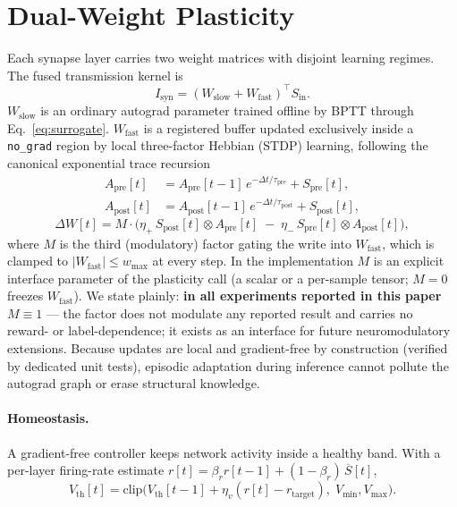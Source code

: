 \documentclass[11pt]{article}
\newcommand{\Wslow}{W_{\text{slow}}}
\newcommand{\Wfast}{W_{\text{fast}}}
\begin{document}
\section{Dual-Weight Plasticity}
Each synapse layer carries two weight matrices with disjoint learning
regimes. The fused transmission kernel is
\begin{equation}
I_{\text{syn}} = (\Wslow + \Wfast)^{\!\top} S_{\text{in}} .
\end{equation}
$\Wslow$ is an ordinary autograd parameter trained offline by BPTT through
Eq.~\eqref{eq:surrogate}. $\Wfast$ is a registered buffer updated
exclusively inside a \texttt{no\_grad} region by local three-factor Hebbian
(STDP) learning, following the canonical exponential trace recursion
\begin{align}
A_{\text{pre}}[t] &= A_{\text{pre}}[t-1]\,e^{-\Delta t/\tau_{\text{pre}}}
   + S_{\text{pre}}[t], \\
A_{\text{post}}[t] &= A_{\text{post}}[t-1]\,e^{-\Delta t/\tau_{\text{post}}}
   + S_{\text{post}}[t],
\end{align}
\begin{equation}
\Delta W[t] = M\cdot\Big(\eta_+\, S_{\text{post}}[t] \otimes A_{\text{pre}}[t]
   \;-\; \eta_-\, S_{\text{pre}}[t] \otimes A_{\text{post}}[t]\Big),
\label{eq:stdp}
\end{equation}
where $M$ is the third (modulatory) factor gating the write into $\Wfast$,
which is clamped to $|{\Wfast}|\le w_{\max}$ at every step. In the
implementation $M$ is an explicit interface parameter of the plasticity
call (a scalar or a per-sample tensor; $M=0$ freezes $\Wfast$). We state
plainly: \textbf{in all experiments reported in this paper $M \equiv 1$} ---
the factor does not modulate any reported result and carries no
reward- or label-dependence; it exists as an interface for future
neuromodulatory extensions. Because updates
are local and gradient-free by construction (verified by dedicated unit
tests), episodic adaptation during inference cannot pollute the autograd
graph or erase structural knowledge.

\paragraph{Homeostasis.} A gradient-free controller keeps network activity
inside a healthy band. With a per-layer firing-rate estimate
$r[t]=\beta_r r[t-1] + (1-\beta_r)\,\overline{S}[t]$,
\begin{equation}
V_{\text{th}}[t] = \mathrm{clip}\big(V_{\text{th}}[t-1]
   + \eta_v (r[t] - r_{\text{target}}),\; V_{\min}, V_{\max}\big).
\end{equation}
\end{document}
